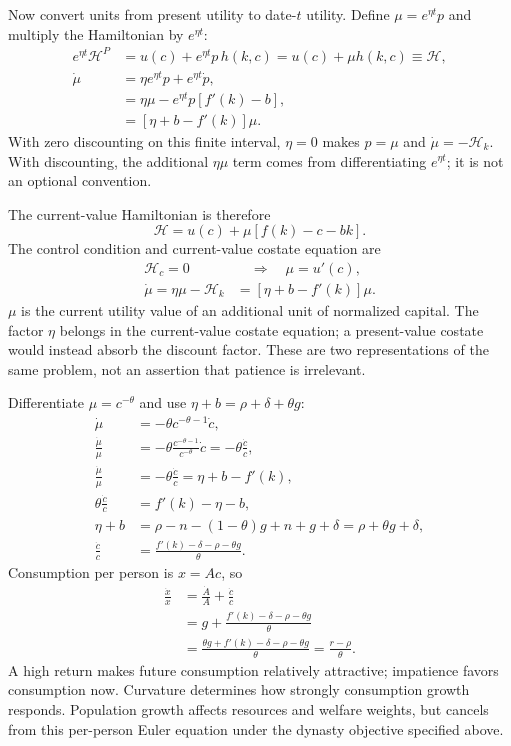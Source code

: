 Now convert units from present utility to date-$t$ utility. Define
$\mu=e^{\eta t}p$ and multiply the Hamiltonian by $e^{\eta t}$:
\begin{align}
e^{\eta t}\mathcal H^P
 &=u(c)+e^{\eta t}p\,h(k,c)
  =u(c)+\mu h(k,c)\equiv\mathcal H,\\
\dot\mu
 &=\eta e^{\eta t}p+e^{\eta t}\dot p,\\
 &=\eta\mu-e^{\eta t}p[f'(k)-b],\\
 &=[\eta+b-f'(k)]\mu.
\end{align}
With zero discounting on this finite interval, $\eta=0$ makes $p=\mu$ and
$\dot\mu=-\mathcal H_k$. With discounting, the additional $\eta\mu$ term
comes from differentiating $e^{\eta t}$; it is not an optional convention.

The current-value Hamiltonian is therefore
\begin{equation}
\mathcal H=u(c)+\mu[f(k)-c-bk].
\end{equation}
The control condition and current-value costate equation are
\begin{align}
\mathcal H_c=0&\quad\Longrightarrow\quad \mu=u'(c),\\
\dot\mu=\eta\mu-\mathcal H_k
&=\left[\eta+b-f'(k)\right]\mu.
\end{align}
$\mu$ is the current utility value of an additional unit of normalized capital.
The factor $\eta$ belongs in the current-value costate equation; a
present-value costate would instead absorb the discount factor. These are two
representations of the same problem, not an assertion that patience is irrelevant.

Differentiate $\mu=c^{-\theta}$ and use
$\eta+b=\rho+\delta+\theta g$:
\begin{align}
\dot\mu&=-\theta c^{-\theta-1}\dot c,\\
\frac{\dot\mu}{\mu}
 &=-\theta\frac{c^{-\theta-1}}{c^{-\theta}}\dot c
  =-\theta\frac{\dot c}{c},\\
\frac{\dot\mu}{\mu}&=-\theta\frac{\dot c}{c}
 =\eta+b-f'(k),\\
\theta\frac{\dot c}{c}&=f'(k)-\eta-b,\\
\eta+b&=\rho-n-(1-\theta)g+n+g+\delta
        =\rho+\theta g+\delta,\\
\frac{\dot c}{c}
&=\frac{f'(k)-\delta-\rho-\theta g}{\theta}.
\label{eq:ramsey-normalized-euler}
\end{align}
Consumption per person is $x=Ac$, so
\begin{equation}\label{eq:ramsey-person-euler}
\begin{aligned}
\frac{\dot x}{x}
 &=\frac{\dot A}{A}+\frac{\dot c}{c}\\
 &=g+\frac{f'(k)-\delta-\rho-\theta g}{\theta}\\
 &=\frac{\theta g+f'(k)-\delta-\rho-\theta g}{\theta}
  =\frac{r-\rho}{\theta}.
\end{aligned}
\end{equation}
A high return makes future consumption relatively attractive; impatience favors
consumption now. Curvature determines how strongly consumption growth responds.
Population growth affects resources and welfare weights, but cancels from this
per-person Euler equation under the dynasty objective specified above.

